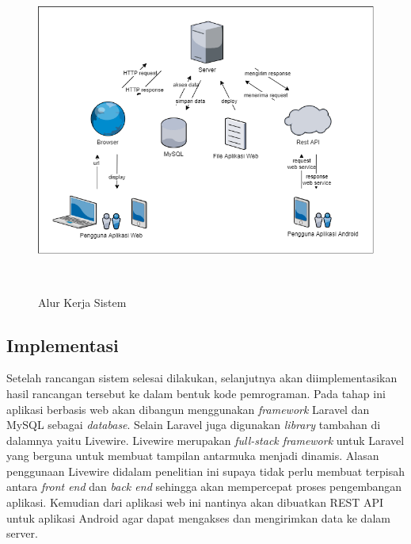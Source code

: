 


\begin{figure}[H]
\centering
{\includegraphics [width = 14cm, height= 10cm]{gambar/alur_kerja_sistem}}
\caption{Alur Kerja Sistem}
\label{alur_kerja_sistem}
\end{figure}

\subsection{Implementasi}
Setelah rancangan sistem selesai dilakukan, selanjutnya akan diimplementasikan hasil rancangan tersebut ke dalam bentuk kode pemrograman. Pada tahap ini aplikasi berbasis web akan dibangun menggunakan \textit{framework} Laravel dan MySQL sebagai \textit{database}. Selain Laravel juga digunakan \textit{library} tambahan di dalamnya yaitu Livewire. Livewire merupakan \textit{full-stack framework} untuk Laravel yang berguna untuk membuat tampilan antarmuka menjadi dinamis. Alasan penggunaan Livewire didalam penelitian ini supaya tidak perlu membuat terpisah antara \textit{front end} dan \textit{back end} sehingga akan mempercepat proses pengembangan aplikasi. Kemudian dari aplikasi web ini nantinya akan dibuatkan REST API untuk aplikasi Android agar dapat mengakses dan mengirimkan data ke dalam server.

